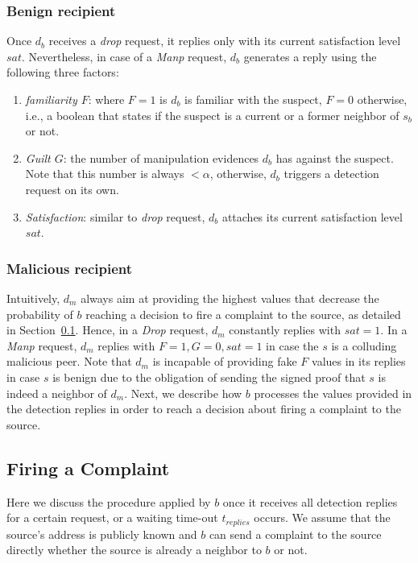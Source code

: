 \subsubsection*{Benign recipient}
Once $d_b$ receives a \textit{drop} request, it replies only with its current satisfaction level $sat$.
Nevertheless, in case of a \textit{Manp} request, $d_b$ generates a reply using the following three factors:
\begin{enumerate}
 \item \textit{familiarity $F$}: where $F=1$ is $d_b$ is familiar with the suspect, $F=0$ otherwise, i.e., a boolean that states if the suspect is a current or a former neighbor of $s_b$ or not.
 \item \textit{Guilt $G$}: the number of manipulation evidences $d_b$ has against the suspect.
 Note that this number is always $<\alpha$, otherwise, $d_b$ triggers a detection request on its own.
 \item \textit{Satisfaction}: similar to \textit{drop} request, $d_b$ attaches its current satisfaction level $sat$.
\end{enumerate}


\subsubsection*{Malicious recipient}


Intuitively, $d_m$ always aim at providing the highest values that decrease the probability of $b$ reaching a decision to fire a complaint to the source, as detailed in Section~\ref{Firing_a_Complain}.
Hence, in a \textit{Drop} request, $d_m$ constantly replies with $sat=1$.
In a \textit{Manp} request, $d_m$ replies with $F=1, G=0, sat=1$ in case the $s$ is a colluding malicious peer.
Note that $d_m$ is incapable of providing fake $F$ values in its replies in case $s$ is benign due to the obligation of sending the signed proof that $s$ is indeed a neighbor of $d_m$. 
Next, we describe how $b$ processes the values provided in the detection replies in order to reach a decision about firing a complaint to the source.

\subsection{Firing a Complaint}
\label{Firing_a_Complain}
Here we discuss the procedure applied by $b$ once it receives all detection replies for a certain request, or a waiting time-out $t_{replies}$ occurs.
We assume that the source's address is publicly known and $b$ can send a complaint to the source directly whether the source is already a neighbor to $b$ or not.
